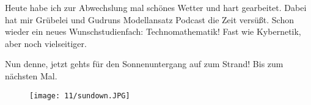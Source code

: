 Heute habe ich zur Abwechslung mal schönes Wetter und hart gearbeitet.
Dabei hat mir Grübelei und Gudruns Modellansatz Podcast die Zeit
versüßt. Schon wieder ein neues Wunschstudienfach: Technomathematik!
Fast wie Kybernetik, aber noch vielseitiger.

Nun denne, jetzt gehts für den Sonnenuntergang auf zum Strand! Bis zum
nächsten Mal.
\begin{figure}[h]
  \centering
  \texttt{[image: 11/sundown.JPG]}
\end{figure}
